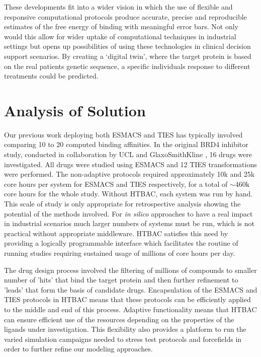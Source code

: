 \documentclass[conference]{IEEEtran}
\begin{document}
These developments fit into a wider vision in which the use of
flexible and responsive computational protocols produce accurate,
precise and reproducible estimates of the free energy of binding with
meaningful error bars. Not only would this allow for wider uptake of
computational techniques in industrial settings but opens up possibilities
of using these technologies in clinical decision support scenarios. By creating
a `digital twin', where the target protein is based on the real patients
genetic sequence, a specific individuals response to different
treatments could be predicted.


\section{Analysis of Solution}\label{sec:analysis}

Our previous work deploying both ESMACS and TIES has typically involved 
comparing 10 to 20 computed binding affinities. In the original BRD4 inhibitor 
study, conducted in collaboration by UCL and GlaxoSmithKline \cite{Wan2017brd4}, 
16 drugs were investigated. All drugs were studied using ESMACS and 12 TIES 
transformations were performed. The non-adaptive protocols required 
approximately 10k and 25k core hours per system for ESMACS and TIES 
respectively, for a total of  $\sim$460k core hours for the whole study. Without 
HTBAC, each system was run by hand. This scale of study is only appropriate for 
retrospective analysis showing the potential of the methods involved. For 
\textit{in silico} approaches to have a real impact in industrial scenarios much 
larger numbers of systems must be run, which is not practical without 
appropriate middleware. HTBAC satisfies this need by providing a logically 
programmable interface which facilitates the routine of running studies 
requiring sustained usage of millions of core hours per day.

The drug design process involved the filtering of millions of compounds to 
smaller number of 'hits' that bind the target protein and then further 
refinement to 'leads' that form the basis of candidate drugs. Encapsulation of 
the ESMACS and TIES protocols in HTBAC means that these protocols can be 
efficiently applied to the middle and end of this process. Adaptive 
functionality means that HTBAC can ensure efficient use of the resources 
depending on the properties of the ligands under investigation. This flexibility 
also provides a platform to run the varied simulation campaigns needed to stress 
test protocols and forcefields in order to further refine our modeling approaches.
\end{document}
